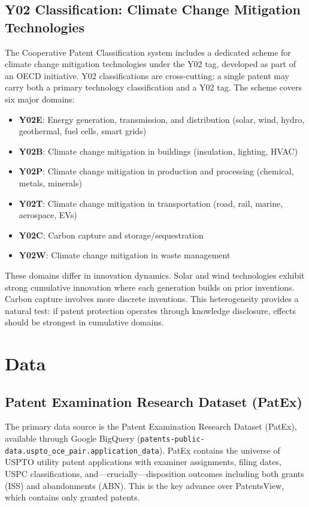 \documentclass[12pt]{article}
\begin{document}
\subsection{Y02 Classification: Climate Change Mitigation Technologies}

The Cooperative Patent Classification system includes a dedicated scheme for climate change mitigation technologies under the Y02 tag, developed as part of an OECD initiative. Y02 classifications are cross-cutting: a single patent may carry both a primary technology classification and a Y02 tag. The scheme covers six major domains:
\begin{itemize}
\item \textbf{Y02E}: Energy generation, transmission, and distribution (solar, wind, hydro, geothermal, fuel cells, smart grids)
\item \textbf{Y02B}: Climate change mitigation in buildings (insulation, lighting, HVAC)
\item \textbf{Y02P}: Climate change mitigation in production and processing (chemical, metals, minerals)
\item \textbf{Y02T}: Climate change mitigation in transportation (road, rail, marine, aerospace, EVs)
\item \textbf{Y02C}: Carbon capture and storage/sequestration
\item \textbf{Y02W}: Climate change mitigation in waste management
\end{itemize}

These domains differ in innovation dynamics. Solar and wind technologies exhibit strong cumulative innovation where each generation builds on prior inventions. Carbon capture involves more discrete inventions. This heterogeneity provides a natural test: if patent protection operates through knowledge disclosure, effects should be strongest in cumulative domains.


\section{Data}

\subsection{Patent Examination Research Dataset (PatEx)}

The primary data source is the Patent Examination Research Dataset (PatEx), available through Google BigQuery (\texttt{patents-public-data.uspto\_oce\_pair.application\_data}). PatEx contains the universe of USPTO utility patent applications with examiner assignments, filing dates, USPC classifications, and---crucially---disposition outcomes including both grants (ISS) and abandonments (ABN). This is the key advance over PatentsView, which contains only granted patents.
\end{document}
